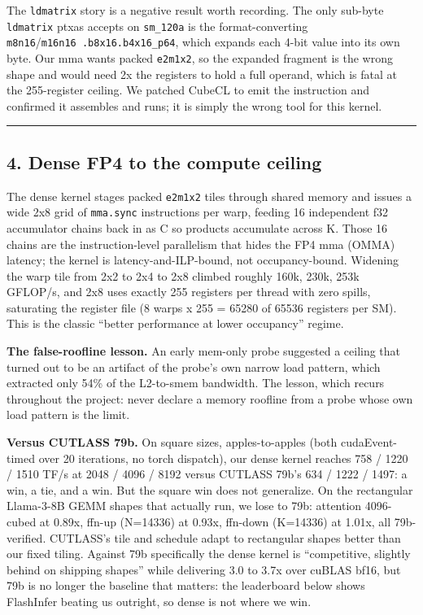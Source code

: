 \documentclass[
]{article}
\begin{document}
The \texttt{ldmatrix} story is a negative result worth recording. The
only sub-byte \texttt{ldmatrix} ptxas accepts on \texttt{sm\_120a} is
the format-converting \texttt{m8n16}/\texttt{m16n16\ .b8x16.b4x16\_p64},
which expands each 4-bit value into its own byte. Our mma wants packed
\texttt{e2m1x2}, so the expanded fragment is the wrong shape and would
need 2x the registers to hold a full operand, which is fatal at the
255-register ceiling. We patched CubeCL to emit the instruction and
confirmed it assembles and runs; it is simply the wrong tool for this
kernel.

\begin{center}\rule{0.5\linewidth}{0.5pt}\end{center}

\subsection{4. Dense FP4 to the compute
ceiling}\label{dense-fp4-to-the-compute-ceiling}

The dense kernel stages packed \texttt{e2m1x2} tiles through shared
memory and issues a wide 2x8 grid of \texttt{mma.sync} instructions per
warp, feeding 16 independent f32 accumulator chains back in as C so
products accumulate across K. Those 16 chains are the instruction-level
parallelism that hides the FP4 mma (OMMA) latency; the kernel is
latency-and-ILP-bound, not occupancy-bound. Widening the warp tile from
2x2 to 2x4 to 2x8 climbed roughly 160k, 230k, 253k GFLOP/s, and 2x8 uses
exactly 255 registers per thread with zero spills, saturating the
register file (8 warps x 255 = 65280 of 65536 registers per SM). This is
the classic ``better performance at lower occupancy'' regime.

\textbf{The false-roofline lesson.} An early mem-only probe suggested a
ceiling that turned out to be an artifact of the probe's own narrow load
pattern, which extracted only 54\% of the L2-to-smem bandwidth. The
lesson, which recurs throughout the project: never declare a memory
roofline from a probe whose own load pattern is the limit.

\textbf{Versus CUTLASS 79b.} On square sizes, apples-to-apples (both
cudaEvent-timed over 20 iterations, no torch dispatch), our dense kernel
reaches 758 / 1220 / 1510 TF/s at 2048 / 4096 / 8192 versus CUTLASS
79b's 634 / 1222 / 1497: a win, a tie, and a win. But the square win
does not generalize. On the rectangular Llama-3-8B GEMM shapes that
actually run, we lose to 79b: attention 4096-cubed at 0.89x, ffn-up
(N=14336) at 0.93x, ffn-down (K=14336) at 1.01x, all 79b-verified.
CUTLASS's tile and schedule adapt to rectangular shapes better than our
fixed tiling. Against 79b specifically the dense kernel is
``competitive, slightly behind on shipping shapes'' while delivering 3.0
to 3.7x over cuBLAS bf16, but 79b is no longer the baseline that
matters: the leaderboard below shows FlashInfer beating us outright, so
dense is not where we win.
\end{document}

